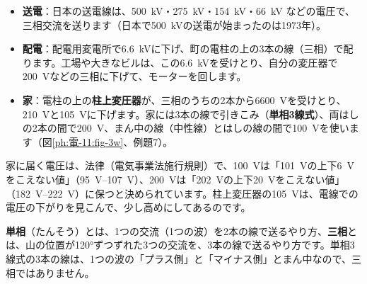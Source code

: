 \begin{itemize}[leftmargin=1.2\zw, itemsep=1pt, topsep=2pt, label={\color{\bkTT}●}]
\item \textbf{送電}：日本の送電線は、\qty{500}{kV}・\qty{275}{kV}・\qty{154}{kV}・\qty{66}{kV} などの電圧で、三相交流を送ります（日本で\qty{500}{kV}の送電が始まったのは1973年）。
\item \textbf{配電}：配電用変電所で\qty{6.6}{kV}に下げ、町の電柱の上の3本の線（三相）で配ります。工場や大きなビルは、この\qty{6.6}{kV}を受けとり、自分の変圧器で\qty{200}{V}などの三相に下げて、モーターを回します。
\item \textbf{家}：電柱の上の\textbf{柱上変圧器}が、三相のうちの2本から\qty{6600}{V}を受けとり、\qty{210}{V}と\qty{105}{V}に下げます。家には3本の線で引きこみ（\textbf{単相3線式}）、両はしの2本の間で\qty{200}{V}、まん中の線（中性線）とはしの線の間で\qty{100}{V}を使います（図\ref{ph:電-11:fig-3w}、例題7）。
\end{itemize}
家に届く電圧は、法律（電気事業法施行規則）で、\qty{100}{V}は「\qty{101}{V}の上下\qty{6}{V}をこえない値」（\qtyrange{95}{107}{V}）、\qty{200}{V}は「\qty{202}{V}の上下\qty{20}{V}をこえない値」（\qtyrange{182}{222}{V}）に保つと決められています。柱上変圧器の\qty{105}{V}は、電線での電圧の下がりを見こんで、少し高めにしてあるのです。

\textbf{単相}（たんそう）とは、1つの交流（1つの波）を2本の線で送るやり方、\textbf{三相}とは、山の位置が120°ずつずれた3つの交流を、3本の線で送るやり方です。単相3線式の3本の線は、1つの波の「プラス側」と「マイナス側」とまん中なので、三相ではありません。

